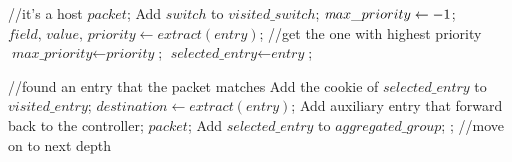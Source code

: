 \begin {tcolorbox}[blanker,float=tbp,
grow to left by=1cm, grow to right by=1cm]
\begin{algorithm}[H]
  \begin{algorithmic}[1]
       //it's a host
        \State \Return $packet$;
      \EndIf
      \State Add $switch$ to $visited\_switch$;
      \State $\textit max\_priority \gets -1$;  
        \State $\textit{field, value, priority} \gets extract(\textit{entry})$;
         //get the one with highest priority 
          \State $\textit{max\_priority} \gets \textit{priority}$;
          \State $\textit{selected\_entry} \gets \textit{entry}$; 
        \EndIf
      \EndFor

       //found an entry that the packet matches
        \State Add the cookie of $selected\_entry$ to $visited\_entry$;
        \State $\textit{destination} \gets extract(\textit{entry})$;
          \State Add auxiliary entry that forward back to the controller;
          \State \Return $packet$;
        \Else
          \State Add $selected\_entry$ to $aggregated\_group$;
          \State {}; //move on to next depth
        \EndIf
      \EndIf
  \end{algorithmic}
\end{algorithm}
\end{tcolorbox}

